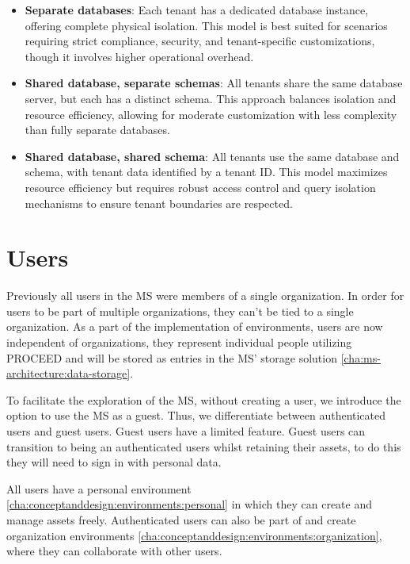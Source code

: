 \begin{itemize}
  \item \textbf{Separate databases}: Each tenant has a dedicated database instance, offering complete physical isolation. This model is best suited for scenarios requiring strict compliance, security, and tenant-specific customizations, though it involves higher operational overhead.

\item \textbf{Shared database, separate schemas}: All tenants share the same database server, but each has a distinct schema. This approach balances isolation and resource efficiency, allowing for moderate customization with less complexity than fully separate databases.

\item \textbf{Shared database, shared schema}: All tenants use the same database and schema, with tenant data identified by a tenant ID. This model maximizes resource efficiency but requires robust access control and query isolation mechanisms to ensure tenant boundaries are respected.
\end{itemize}


\section{Users}
\label{cha:conceptanddesign:users}

Previously all users in the MS were members of a single organization.
In order for users to be part of multiple organizations, they can't be tied to a single
organization.
As a part of the implementation of environments, users are now independent of
organizations,
they represent individual people utilizing PROCEED and will be stored as entries in
the MS' storage solution \ref{cha:ms-architecture:data-storage}.

To facilitate the exploration of the MS, without creating a user, we introduce the option
to use the MS as a guest.
Thus, we differentiate between authenticated users and guest users.
Guest users have a limited feature.
Guest users can transition to being an authenticated users whilst retaining their
assets, to do this they will need to sign in with personal data.

All users have a personal environment \ref{cha:conceptanddesign:environments:personal}
in which they can create and manage assets freely.
Authenticated users can also be part of and create organization environments
\ref{cha:conceptanddesign:environments:organization},
where they can collaborate with other users.


